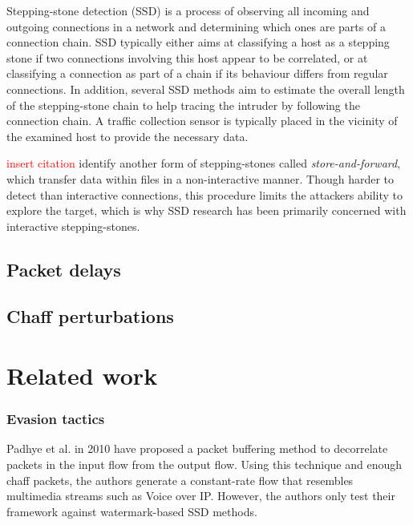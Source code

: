 \documentclass[conference]{IEEEtran}\usepackage[]{graphicx}\usepackage[]{color}
\begin{document}
Stepping-stone detection (SSD) is a process of observing all incoming and outgoing connections in a network and determining which ones are parts of a connection chain. %
SSD typically either aims at classifying a host as a stepping stone if two connections involving this host appear to be correlated, or at classifying a connection as part of a chain if its behaviour differs from regular connections. In addition, several SSD methods aim to estimate the overall length of the stepping-stone chain to help tracing the intruder by following the connection chain. 
A traffic collection sensor is typically placed in the vicinity of the examined host to provide the necessary data. 

\textcolor{red}{insert citation} identify another form of stepping-stones called \textit{store-and-forward}, which transfer data within files in a non-interactive manner. Though harder to detect than interactive connections, this procedure limits the attackers ability to explore the target, which is why SSD research has been primarily concerned with interactive stepping-stones.

\subsection{Packet delays}

\subsection{Chaff perturbations}



\section{Related work}\label{Sec:Relatedwork}

\subsubsection{Evasion tactics}

Padhye et al. \cite{padhye2010evading} in 2010 have proposed a packet buffering method to decorrelate packets in the input flow from the output flow. Using this technique and enough chaff packets, the authors generate a constant-rate flow that resembles multimedia streams such as Voice over IP. However, the authors only test their framework against watermark-based SSD methods. 
\end{document}
